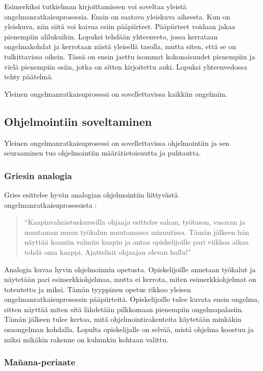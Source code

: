 Esimerkiksi tutkielman kirjoittamiseen voi soveltaa yleistä
ongelmanratkaisuprosessia. Ensin on saatava yleiskuva aiheesta. Kun on yleiskuva,
niin siitä voi kaivaa esiin pääpiirteet. Pääpiirteet voidaan jakaa pienempiin
alilukuihin. Lopuksi tehdään yhteenveto, jossa kerrataan ongelmakohdat ja
kerrotaan niistä yleisellä tasolla, mutta siten, että se on tulkittavissa
oikein. Tässä on ensin jaettu isommat kokonaisuudet pienempiin ja vielä
pienempiin osiin, jotka on sitten kirjoitettu auki. Lopuksi yhteenvedossa tehty
päätelmä.

Yleinen ongelmanratkaisuprosessi on sovellettavissa kaikkiin ongelmiin.

\subsection{Ohjelmointiin soveltaminen}

Yleinen ongelmanratkaisuprosessi on sovellettavissa ohjelmointiin ja sen
seuraaminen tuo ohjelmointiin määrätietoisuutta ja puhtautta.

\subsubsection{Griesin analogia}

Gries esittelee hyvän analogian ohjelmointiin liittyvästä
ongelmanratkaisuprosessista \cite{Gries:1974:WTI:953057.810447}:

\begin{quotation}
``Kaapinvalmistuskurssilla ohjaaja esittelee sahan, työtason, vasaran ja
muutaman muun työkalun muutamassa minuutissa. Tämän jälkeen hän näyttää
kauniin valmiin kaapin ja antaa opiskelijoille pari viikkoa aikaa tehdä oma
kaappi. Ajattelisit ohjaajan olevan hullu!''
\end{quotation}

Analogia kuvaa hyvin ohjelmoinnin opetusta. Opiskelijoille annetaan työkalut ja
näytetään pari esimerkkiohjelmaa, mutta ei kerrota, miten esimerkkiohjelmat on
toteutettu ja miksi. Tämän tyyppinen opetus rikkoo yleisen
ongelmanratkaisuprosessin pääpiirteitä. Opiskelijoille tulee kuvata ensin
ongelma, sitten näyttää miten sitä lähdetään pilkkomaan pienempiin
ongelmapalasiin. Tämän jälkeen tulee kertoa, mitä ohjelmointirakenteita
käytetään minkäkin osaongelman kohdalla. Lopulta opiskelijalle on selvää, mistä
ohjelma koostuu ja miksi mikäkin rakenne on kuhunkin kohtaan valittu.

\subsubsection{Mañana-periaate}

